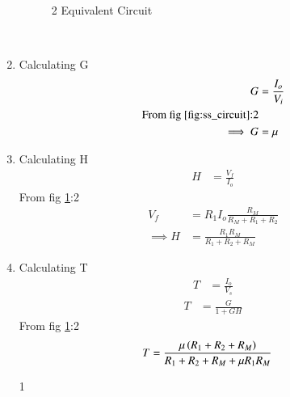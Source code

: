 \begin{enumerate}[label=\thesubsection.\arabic*.,ref=\thesubsection.\theenumi]
\begin{figure}[!ht]
	\begin{center}
		\resizebox{\columnwidth}{!}{}
	\end{center}
\caption{2 Equivalent Circuit}
\label{fig:ss_circuit}
\end{figure}\\
\item
Calculating G\\
\solution
\begin{align}
G &= \frac{I_{o}}{V_{i}} \label{eq:G}\\
\text{From fig \ref{fig:ss_circuit}:2}\\
\implies G&= \mu
\end{align}
\item
Calculating H\\
\solution
\begin{align}
H &= \frac{V_{f}}{I_{o}} \label{eq:H}
\end{align}
From fig \ref{fig:ss_circuit}:2\\
\begin{align}
V_{f}&=R_{1}I_{o}\frac{R_M}{R_M+R_1+R_2}\\
\implies
H &= \frac{R_1R_M}{R_1+R_2+R_M}
\end{align}
\item
Calculating T\\
\solution
\begin{align}
T &= \frac{I_{o}}{V_{s}} \label{eq:To}
\end{align}
\begin{align}
T &= \frac{G}{1+GH} \label{eq:T}
\end{align}
From fig \ref{fig:ss_circuit}:2
\begin{align}
T&= \frac{\mu \left(R_1+R_2+R_M\right)}{R_1+R_2+R_M+ \mu R_1R_M}
\end{align}


\begin{table}[!ht]
\centering

\caption{1}
\label{table: Input_Table}
\end{table}



\end{enumerate}
